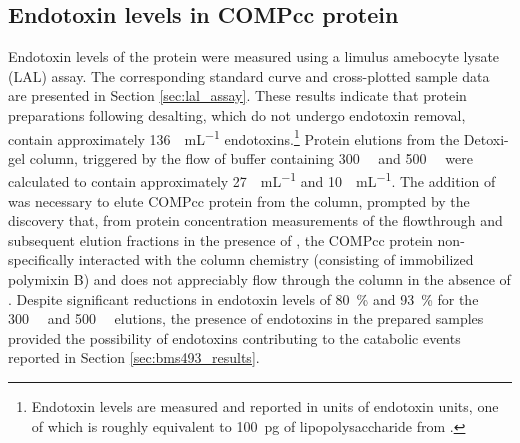 \begin{refsection}
\subsection{Endotoxin levels in COMPcc protein}
\label{sec:endotoxins}

Endotoxin levels of the protein were measured using a limulus amebocyte lysate
(LAL) assay. The corresponding standard curve and cross-plotted sample data are
presented in Section \ref{sec:lal_assay}. These results indicate that protein
preparations following desalting, which do not undergo endotoxin removal,
contain approximately \SI{136}{\EU\per\mL} endotoxins.\footnote{Endotoxin levels
are measured and reported in units of endotoxin units, one of which is roughly
equivalent to \SI{100}{\pico\gram} of lipopolysaccharide from .}
Protein elutions from the Detoxi-gel column, triggered by the flow of buffer
containing \SI{300}{\milli\moLar} and \SI{500}{\milli\moLar}  were
calculated to contain approximately \SI{27}{\EU\per\mL} and \SI{10}{\EU\per\mL}.
The addition of  was necessary to elute COMPcc protein from the column,
prompted by the discovery that, from protein concentration measurements of the
flowthrough and subsequent elution fractions in the presence of , the
COMPcc protein non-specifically interacted with the column chemistry (consisting
of immobilized polymixin B) and does not appreciably flow through the column in
the absence of . Despite significant reductions in endotoxin levels of
\SI{80}{\percent} and \SI{93}{\percent} for the \SI{300}{\milli\moLar} and
\SI{500}{\milli\moLar}  elutions, the presence of endotoxins in the
prepared samples provided the possibility of endotoxins contributing to the
catabolic events reported in Section \ref{sec:bms493_results}.


\end{refsection}
